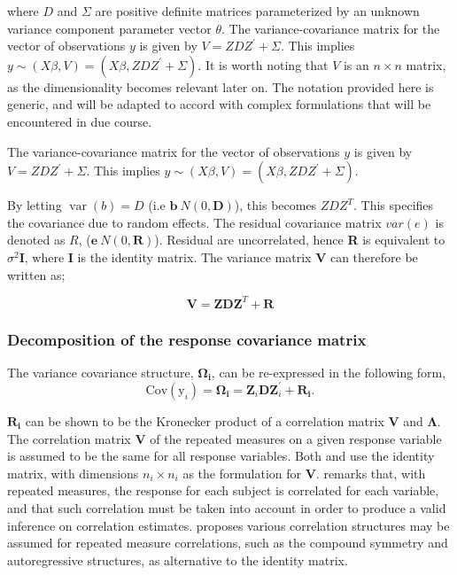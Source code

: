\documentclass[12pt, a4paper]{report}
\theoremstyle{plain}
\theoremstyle{definition}
\theoremstyle{remark}
\begin{document}
	
	
	
	where $D$ and $\Sigma$ are positive definite matrices parameterized by an unknown variance component parameter vector $ \theta.$ The variance-covariance matrix for the vector of observations $y$ is given by $V = ZDZ^{\prime}+ \Sigma.$ This implies $y \sim(X\beta, V) = (X\beta,ZDZ^{\prime}+ \Sigma)$. It is worth noting that $V$ is an $n \times n$ matrix, as the dimensionality becomes relevant later on. The notation provided here is generic, and will be adapted to accord with complex formulations that will be encountered in due course.
	
	
	The variance-covariance matrix for the vector of observations $y$ is given by $V = ZDZ^{\prime}+ \Sigma.$ This implies $y \sim(X\beta, V) = (X\beta,ZDZ^{\prime}+ \Sigma)$. 
	
	
	By letting $\operatorname{var}(b) = D$ (i.e $\textbf{b} ~ N(0,\textbf{D})$), this becomes $ZDZ^{T}$. This specifies the covariance due to random
	effects. The residual covariance matrix $var(e)$ is denoted as $R$, ($\textbf{e} ~ N(0,\textbf{R})$). Residual are uncorrelated,
	hence \textbf{R} is equivalent to $\sigma^{2}$\textbf{I}, where \textbf{I} is the identity matrix. The variance matrix \textbf{V}
	can therefore be written as;
	
	\begin{equation}
	\textbf{V}  = \textbf{ZDZ}^{T} + \textbf{R}
	\end{equation}
	
	
	
	\subsubsection{Decomposition of the response covariance matrix}
	The variance covariance structure, $\boldsymbol{\Omega_{i}}$, can be re-expressed in the following form,
	\[
	\mbox{Cov}(\mbox{y}_{i}) = \boldsymbol{\Omega_{i}} = \boldsymbol{Z}_{i}\boldsymbol{D}\boldsymbol{Z}_{i}^\prime + \boldsymbol{R_{i}}.
	\]

	$\boldsymbol{R_{i}}$ can be shown to be the Kronecker product of a correlation matrix $\boldsymbol{V}$ and $\boldsymbol{\Lambda}$. The correlation matrix $\boldsymbol{V}$ of the repeated measures on a given response variable is assumed to be the same for all response variables. Both \citet{hamlett} and \citet{lam} use the identity matrix, with dimensions $n_{i} \times n_{i}$ as the formulation for $\boldsymbol{V}$. \citet{ARoy2009} remarks that, with repeated measures, the response for each subject is correlated for each variable, and that such correlation must be taken into account in order to produce a valid inference on correlation estimates.  \citet{roy2006} proposes various correlation structures may be assumed for repeated measure correlations, such as the compound symmetry and autoregressive structures, as alternative to the identity matrix.
	
\end{document}
